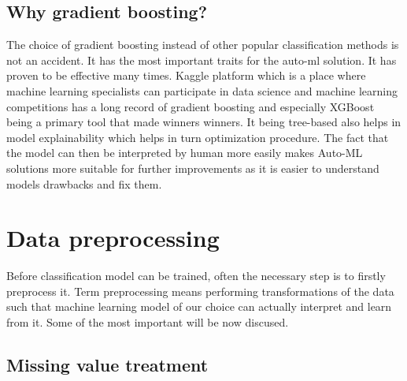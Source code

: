\documentclass[a4paper,twoside,12pt]{book}
\begin{document}
\subsection{Why gradient boosting?}

The choice of gradient boosting instead of other popular classification methods is not an accident. It has the most important traits for the auto-ml solution. It has proven to be effective many times. Kaggle platform which is a place where machine learning specialists can participate in data science and machine learning competitions has a long record of gradient boosting and especially XGBoost being a primary tool that made winners winners. 
It being tree-based also helps in model explainability which helps in turn optimization procedure. The fact that the model can then be interpreted by human more easily makes Auto-ML solutions more suitable for further improvements as it is easier to understand models drawbacks and fix them.


\section{Data preprocessing}

Before classification model can be trained, often the necessary step is to firstly preprocess it. Term preprocessing means performing transformations of the data such that machine learning model of our choice can actually interpret and learn from it. Some of the most important will be now discused.

\subsection{Missing value treatment}
\end{document}
